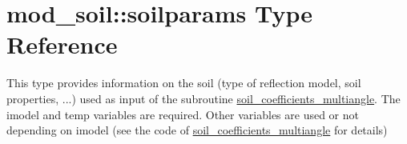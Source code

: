 \hypertarget{typemod__soil_1_1soilparams}{
\section{mod\_\-soil::soilparams Type Reference}
\label{typemod__soil_1_1soilparams}
}


This type provides information on the soil (type of reflection model, soil properties, ...) used as input of the subroutine \hyperlink{namespacemod__soil_addfafc544d6649e3cf0bec775d55996e}{soil\_\-coefficients\_\-multiangle}. The imodel and temp variables are required. Other variables are used or not depending on imodel (see the code of \hyperlink{namespacemod__soil_addfafc544d6649e3cf0bec775d55996e}{soil\_\-coefficients\_\-multiangle} for details)  



